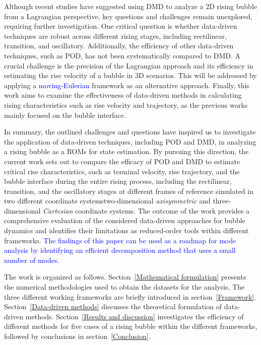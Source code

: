 \documentclass[a4paper,fleqn]{cas-sc}
\newcommand{\hl}[1]{\textcolor{blue}{#1}} %
\newcommand{\hl}[1]{#1} %
\begin{document}
	Although recent studies have suggested using DMD to analyze a 2D rising bubble from a Lagrangian perspective, key questions and challenges remain unexplored, requiring further investigation. One critical question is whether data-driven techniques are robust across different rising stages, including rectilinear, transition, and oscillatory. Additionally, the efficiency of other data-driven techniques, such as POD, has not been systematically compared to DMD. A crucial challenge is the precision of the Lagrangian approach and its efficiency in estimating the rise velocity of a bubble in 3D scenarios. This will be addressed by applying a \hl{moving-Eulerian} framework as an alternative approach. Finally, this work aims to examine the effectiveness of data-driven methods in calculating rising characteristics such as rise velocity and trajectory, as the previous works mainly focused on the bubble interface. 
	
	In summary, the outlined challenges and questions have inspired us to investigate the application of data-driven techniques, including POD and DMD, in analyzing a rising bubble as a ROMs for state estimation. By pursuing this direction, the current work sets out to compare the efficacy of POD and DMD to estimate critical rise characteristics, such as terminal velocity, rise trajectory, and the bubble interface during the entire rising process, including the rectilinear, transition, and the oscillatory stages at different frames of reference simulated in two different coordinate systems\textemdash two-dimensional \textit{axisymmetric} and three-dimensional \textit{Cartesian} coordinate systems. The outcome of the work provides a comprehensive evaluation of the considered data-driven approaches for bubble dynamics and identifies their limitations as reduced-order tools within different frameworks. \hl{The findings of this paper can be used as a roadmap for mode analysis by identifying an efficient decomposition method that uses a small number of modes.}
	
	The work is organized as follows. Section~\ref{Mathematical formulation} presents the numerical methodologies used to obtain the datasets for the analysis. The three different working frameworks are briefly introduced in section~\ref{Framework}. Section~\ref {Data-driven methods} discusses the theoretical formulation of data-driven methods. Section~\ref{Results and discussion} investigates the efficiency of different methods for five cases of a rising bubble within the different frameworks, followed by conclusions in section~\ref{Conclusion}.
	
\end{document}
